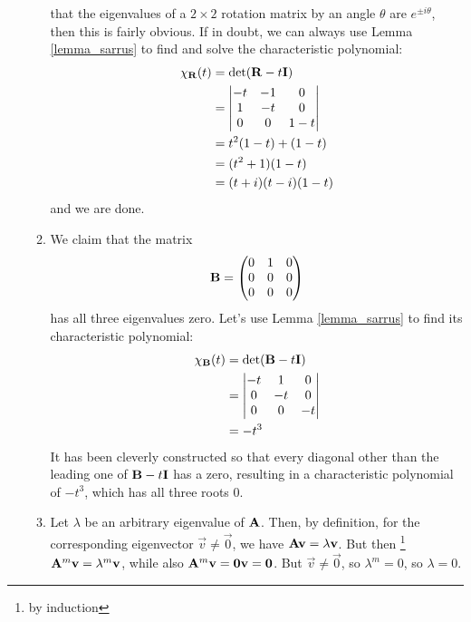 \documentclass[fleqn,a4paper,11pt]{article}
\begin{document}
\begin{enumerate}[label=\textbf{\arabic*.}]
\begin{enumerate}[label=(\alph*)]
     that the eigenvalues of a \(2 \times 2\) rotation matrix by an angle
     \(\theta\) are \(e^{\pm i\theta}\), then this is fairly obvious. If in
     doubt, we can always use Lemma \ref{lemma_sarrus} to find and solve the
     characteristic polynomial:
     \begin{align*}
      \chi_{\mathbf{R}}(t)
       &= \det(\mathbf{R} - t\mathbf{I}) \\
       &= \begin{vmatrix}
        -t & -1 & 0 \\
        1 & -t & 0 \\
        0 & 0 & 1 - t
       \end{vmatrix} \\
       &= t^2(1 - t) + (1 - t) \\
       &= (t^2 + 1)(1 - t) \\
       &= (t + i)(t - i)(1 - t)
     \end{align*}
     and we are done.
    \item
     We claim that the matrix
     \begin{equation*}
      \mathbf{B} =
      \begin{pmatrix}
       0 & 1 & 0 \\
       0 & 0 & 0 \\
       0 & 0 & 0
      \end{pmatrix}
     \end{equation*}
     has all three eigenvalues zero. Let's use Lemma \ref{lemma_sarrus} to find
     its characteristic polynomial:
     \begin{align*}
      \chi_{\mathbf{B}}(t)
       &= \det(\mathbf{B} - t \mathbf{I}) \\
       &= \begin{vmatrix}
        -t & 1 & 0 \\
        0 & -t & 0 \\
        0 & 0 & -t
       \end{vmatrix} \\
       &= -t^3
     \end{align*}
     It has been cleverly constructed so that every diagonal other than the
     leading one of \(\mathbf{B} - t \mathbf{I}\) has a zero, resulting in a
     characteristic polynomial of \(-t^3\), which has all three roots \(0\).
    \item
     Let \(\lambda\) be an arbitrary eigenvalue of \(\mathbf{A}\). Then, by
     definition, for the corresponding eigenvector \(\vec v \ne \vec 0\), we
     have \(\mathbf{A} \mathrm{\mathbf{v}} = \lambda \mathrm{\mathbf{v}}\). But then \footnote{by induction}
     \(\mathbf{A}^m \mathrm{\mathbf{v}} = \lambda^m \mathrm{\mathbf{v}}\), while also
     \(\mathbf{A}^m \mathrm{\mathbf{v}} = \mathbf{0} \mathrm{\mathbf{v}} = \mathrm{\mathbf{0}}\). But
     \(\vec v \ne \vec 0\), so \(\lambda^m = 0\), so \(\lambda = 0\).


\end{enumerate}
\end{enumerate}
\end{document}
